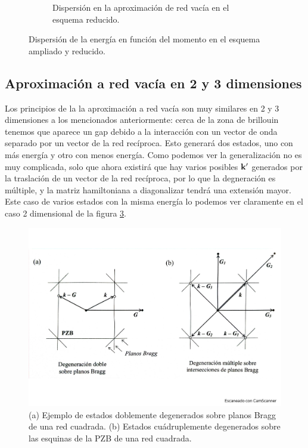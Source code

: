 \begin{figure}[h!]
\begin{subfigure}{0.45\linewidth}
		\caption{Dispersión en la aproximación de red vacía en el esquema reducido.}
		\label{Fig:07-03b}
	\end{subfigure} 
	\caption{Dispersión de la energía en función del momento en el esquema ampliado y reducido.}
\end{figure}   


\subsection{Aproximación a red vacía en 2 y 3 dimensiones}

Los principios de la la aproximación a red vacía son muy similares en 2 y 3 dimensiones a los mencionados anteriormente: cerca de la zona de brillouin tenemos que aparece un gap debido a la interacción con un vector de onda separado por un vector  de la red recíproca. Esto generará dos estados, uno con más energía y otro con menos energía. Como podemos ver la generalización no es muy complicada, solo que ahora existirá que hay varios posibles $\mathbf{k}'$ generados por la traslación de un vector de la red recíproca, por lo que la degneración es múltiple, y la matriz hamiltoniana a diagonalizar tendrá una extensión mayor. Este caso de varios estados con la misma energía lo podemos ver claramente en el caso 2 dimensional de la figura \ref{Fig:07-04}.

\begin{figure}[h!] \centering
	\includegraphics[scale=0.35]{Cuerpo/Ch_07/Fotos libro 2.pdf}
	\caption{(a) Ejemplo de estados doblemente degenerados sobre planos Bragg de una red cuadrada. (b) Estados cuádruplemente degenerados sobre las esquinas de la PZB de una red cuadrada.}
	\label{Fig:07-04}
\end{figure}    

